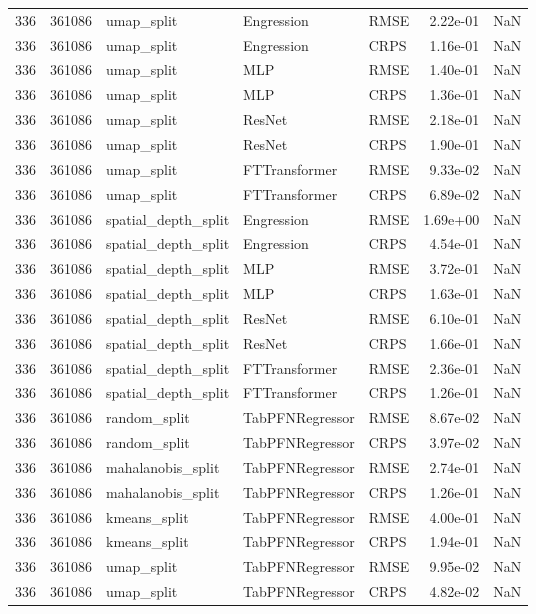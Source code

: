 \begin{tabular}{rrlllrr}
336 & 361086 & umap\_split & Engression & RMSE & 2.22e-01 & NaN \\
336 & 361086 & umap\_split & Engression & CRPS & 1.16e-01 & NaN \\
336 & 361086 & umap\_split & MLP & RMSE & 1.40e-01 & NaN \\
336 & 361086 & umap\_split & MLP & CRPS & 1.36e-01 & NaN \\
336 & 361086 & umap\_split & ResNet & RMSE & 2.18e-01 & NaN \\
336 & 361086 & umap\_split & ResNet & CRPS & 1.90e-01 & NaN \\
336 & 361086 & umap\_split & FTTransformer & RMSE & 9.33e-02 & NaN \\
336 & 361086 & umap\_split & FTTransformer & CRPS & 6.89e-02 & NaN \\
336 & 361086 & spatial\_depth\_split & Engression & RMSE & 1.69e+00 & NaN \\
336 & 361086 & spatial\_depth\_split & Engression & CRPS & 4.54e-01 & NaN \\
336 & 361086 & spatial\_depth\_split & MLP & RMSE & 3.72e-01 & NaN \\
336 & 361086 & spatial\_depth\_split & MLP & CRPS & 1.63e-01 & NaN \\
336 & 361086 & spatial\_depth\_split & ResNet & RMSE & 6.10e-01 & NaN \\
336 & 361086 & spatial\_depth\_split & ResNet & CRPS & 1.66e-01 & NaN \\
336 & 361086 & spatial\_depth\_split & FTTransformer & RMSE & 2.36e-01 & NaN \\
336 & 361086 & spatial\_depth\_split & FTTransformer & CRPS & 1.26e-01 & NaN \\
336 & 361086 & random\_split & TabPFNRegressor & RMSE & 8.67e-02 & NaN \\
336 & 361086 & random\_split & TabPFNRegressor & CRPS & 3.97e-02 & NaN \\
336 & 361086 & mahalanobis\_split & TabPFNRegressor & RMSE & 2.74e-01 & NaN \\
336 & 361086 & mahalanobis\_split & TabPFNRegressor & CRPS & 1.26e-01 & NaN \\
336 & 361086 & kmeans\_split & TabPFNRegressor & RMSE & 4.00e-01 & NaN \\
336 & 361086 & kmeans\_split & TabPFNRegressor & CRPS & 1.94e-01 & NaN \\
336 & 361086 & umap\_split & TabPFNRegressor & RMSE & 9.95e-02 & NaN \\
336 & 361086 & umap\_split & TabPFNRegressor & CRPS & 4.82e-02 & NaN \\

\end{tabular}
